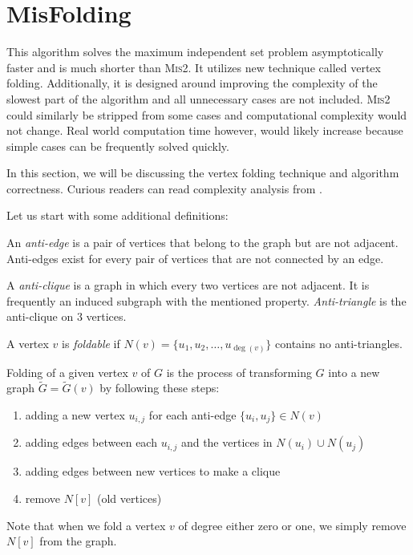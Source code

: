 \section{MisFolding}
\label{sec:misfolding}
This algorithm solves the maximum independent set problem asymptotically faster and is much shorter than \textsc{Mis2}. It utilizes new technique called vertex folding. Additionally, it is designed around improving the complexity of the slowest part of the algorithm and all unnecessary cases are not included. \textsc{Mis2} could similarly be stripped from some cases and computational complexity would not change. Real world computation time however, would likely increase because simple cases can be frequently solved quickly. 

In this section, we will be discussing the vertex folding technique and algorithm correctness. Curious readers can read complexity analysis from \cite{grandoni2006measure}. 

Let us start with some additional definitions:

\begin{defn}
An \emph{anti-edge} is a pair of vertices that belong to the graph but are not adjacent. Anti-edges exist for every pair of vertices that are not connected by an edge.
\end{defn}

\begin{defn}
A \emph{anti-clique} is a graph in which every two vertices are not adjacent. It is frequently an induced subgraph with the mentioned property. \emph{Anti-triangle} is the anti-clique on $3$ vertices.
\end{defn}

\begin{defn}
A vertex $v$ is \emph {foldable} if $N(v)=\{u_1,u_2, \ldots,\allowbreak u_{\deg(v)}\}$ contains no anti-triangles.
\end{defn}

\begin{defn}
Folding of a given vertex $v$ of $G$ is the process of transforming $G$ into a new graph $\tilde{G} = \tilde{G}(v)$ by following these steps: 
\begin{enumerate}
    \item adding a new vertex $u_{i,j}$ for each anti-edge $\{u_i,u_j\} \in N(v)$
    \item adding edges between each $u_{i,j}$ and the vertices in $N(u_i) \cup N(u_j)$
    \item adding edges between new vertices to make a clique
    \item remove $N[v]$ (old vertices)
\end{enumerate}
\end{defn}
Note that when we fold a vertex $v$ of degree either zero or one, we simply remove $N[v]$ from the graph.

